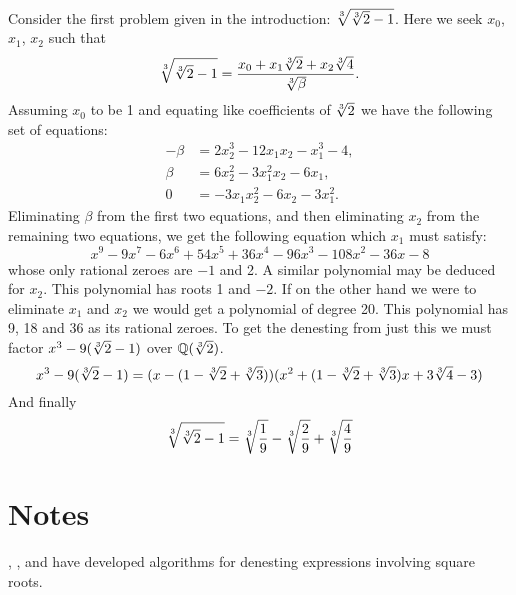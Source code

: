 Consider the first problem given in the introduction: 
$\root 3 \of {\root 3 \of 2 -1 }$.
Here we seek $x_0$, $x_1$, $x_2$ such that 
\[
\root 3 \of {\root 3 \of 2 -1 } =
\frac{x_0 + x_1 \root 3 \of 2 + x_2 \root 3 \of 4}{\root 3 \of \beta}.
\]
Assuming $x_0$ to be 1 and equating like coefficients of $\root 3 \of 2$
we have the following set of equations: \
\[
\begin{aligned}
- \beta &= 2 x_2^3 - 12x_1 x_2 - x_1^3 - 4,\\
\beta &= 6 x_2^2 - 3 x_1^2 x_2 - 6 x_1,\\
0 &= -3 x_1 x_2^2 - 6 x_2 - 3 x_1^2.
\end{aligned}
\]
Eliminating $\beta$ from the first two equations, and then eliminating $x_2$
from the remaining two equations, we get the following equation which $x_1$
must satisfy: 
\[
x^9 - 9 x^7 - 6 x^6 + 54 x^5 + 36 x^4 - 96 x^3 - 108 x^2 - 36 x - 8
\]
whose only rational zeroes are $-1$ and 2.  A similar polynomial may be deduced
for $x_2$.  This polynomial has roots 1 and $-2$.  If on the other
hand we were to eliminate $x_1$ and $x_2$ we would get a polynomial
of degree 20.  This polynomial has 9, 18 and 36 as its rational zeroes.
To get the denesting from just this we must
factor $x^3 - 9 (\root 3 \of 2 - 1)$ over $\Q(\root 3 \of 2)$.
\[
x^3 - 9(\root 3 \of 2 - 1) = (x - (1 - \root 3 \of 2 + \root 3 \of 3))
(x^2 + (1 - \root 3 \of 2 + \root 3 \of 3)x + 3 \root 3 \of 4 - 3)
\]
And finally 
\[
\root 3 \of {\root 3 \of 2 -1} = \root 3 \of {\frac{1}{9}} 
- \root 3 \of {\frac{2}{9}} + \root 3 \of {\frac{4}{9}}
\]


\section*{Notes}

\footnotesize

 {\Borodin}, {\Fagin},
{\Hopcroft} and {\Tompa} \cite{Borodin1985-gv} have developed
algorithms for denesting expressions involving square roots.

\normalsize
